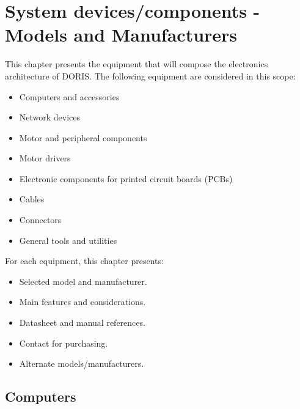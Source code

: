 

\chapter{System devices/components - Models and Manufacturers}
This chapter presents the equipment that will compose the electronics architecture of DORIS. The following equipment are considered in this scope:
\begin{itemize}
  \item Computers and accessories
  \item Network devices
  \item Motor and peripheral components
  \item Motor drivers
  \item Electronic components for printed circuit boards (PCBs)
  \item Cables
  \item Connectors
  \item General tools and utilities
\end{itemize}
For each equipment, this chapter presents:
\begin{itemize}
  \item Selected model and manufacturer.
  \item Main features and considerations.
  \item Datasheet and manual references.
  \item Contact for purchasing.
  \item Alternate models/manufacturers.
\end{itemize}

\section{Computers} \label{DEVICE:PC}
